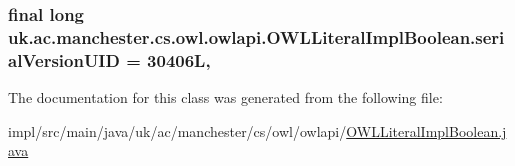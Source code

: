 \hypertarget{classuk_1_1ac_1_1manchester_1_1cs_1_1owl_1_1owlapi_1_1_o_w_l_literal_impl_boolean_a25752ddbccf9fe351f6d856652b2d404}{
\subsubsection[{serial\-Version\-U\-I\-D}]{\setlength{\rightskip}{0pt plus 5cm}final long uk.\-ac.\-manchester.\-cs.\-owl.\-owlapi.\-O\-W\-L\-Literal\-Impl\-Boolean.\-serial\-Version\-U\-I\-D = 30406\-L\hspace{0.3cm}{\ttfamily [static]}, {\ttfamily [private]}}}\label{classuk_1_1ac_1_1manchester_1_1cs_1_1owl_1_1owlapi_1_1_o_w_l_literal_impl_boolean_a25752ddbccf9fe351f6d856652b2d404}


The documentation for this class was generated from the following file\-:\begin{DoxyCompactItemize}
\item 
impl/src/main/java/uk/ac/manchester/cs/owl/owlapi/\hyperlink{_o_w_l_literal_impl_boolean_8java}{O\-W\-L\-Literal\-Impl\-Boolean.\-java}\end{DoxyCompactItemize}
